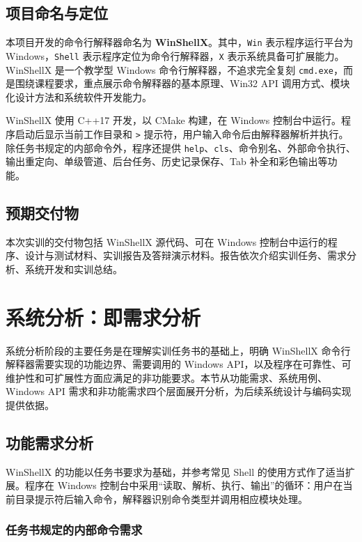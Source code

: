 \documentclass[UTF8,a4paper,12pt,fontset=none]{ctexart}
\begin{document}
\subsection{项目命名与定位}

本项目开发的命令行解释器命名为 \textbf{WinShellX}。其中，\texttt{Win} 表示程序运行平台为 Windows，\texttt{Shell} 表示程序定位为命令行解释器，\texttt{X} 表示系统具备可扩展能力。WinShellX 是一个教学型 Windows 命令行解释器，不追求完全复刻 \texttt{cmd.exe}，而是围绕课程要求，重点展示命令解释器的基本原理、Win32 API 调用方式、模块化设计方法和系统软件开发能力。

WinShellX 使用 C++17 开发，以 CMake 构建，在 Windows 控制台中运行。程序启动后显示当前工作目录和 \texttt{>} 提示符，用户输入命令后由解释器解析并执行。除任务书规定的内部命令外，程序还提供 \texttt{help}、\texttt{cls}、命令别名、外部命令执行、输出重定向、单级管道、后台任务、历史记录保存、Tab 补全和彩色输出等功能。

\subsection{预期交付物}

本次实训的交付物包括 WinShellX 源代码、可在 Windows 控制台中运行的程序、设计与测试材料、实训报告及答辩演示材料。报告依次介绍实训任务、需求分析、系统开发和实训总结。

\section{系统分析：即需求分析}

系统分析阶段的主要任务是在理解实训任务书的基础上，明确 WinShellX 命令行解释器需要实现的功能边界、需要调用的 Windows API，以及程序在可靠性、可维护性和可扩展性方面应满足的非功能要求。本节从功能需求、系统用例、Windows API 需求和非功能需求四个层面展开分析，为后续系统设计与编码实现提供依据。

\subsection{功能需求分析}

WinShellX 的功能以任务书要求为基础，并参考常见 Shell 的使用方式作了适当扩展。程序在 Windows 控制台中采用“读取、解析、执行、输出”的循环：用户在当前目录提示符后输入命令，解释器识别命令类型并调用相应模块处理。

\subsubsection{任务书规定的内部命令需求}
\end{document}
